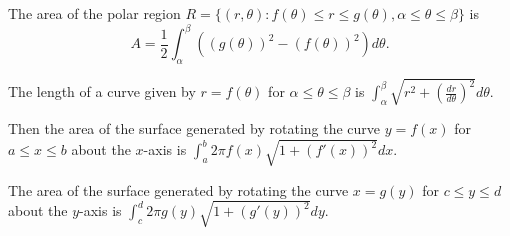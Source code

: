 \documentclass[10pt]{article}
\begin{document}
The area of the polar region 
$R=\{(r, \theta): f(\theta)\le r\le g(\theta), \alpha\le
\theta\le \beta\}$ is 
$$A=\frac{1}{2}\int_{\alpha}^{\beta}
((g(\theta))^{2}-(f(\theta))^{2})d\theta.$$


The length of a curve given by $r=f(\theta)$ for $\alpha\le
\theta\le \beta$ is ${\displaystyle \int_{\alpha}^{\beta}
\sqrt{r^{2}+\left(\frac{dr}{d\theta}\right)^{2}}d\theta}$.




Then the area
of the surface generated by rotating the curve 
$y=f(x)$ for $a\le x\le b$ about the $x$-axis is 
${\displaystyle \int_{a}^{b}2\pi f(x)\sqrt{1+(f'(x))^{2}}dx}$.

The area
of the surface generated by rotating the curve 
$x=g(y)$ for $c\le y\le d$ about the $y$-axis is 
${\displaystyle \int_{c}^{d}2\pi g(y)\sqrt{1+(g'(y))^{2}}dy}$.
\end{document}
